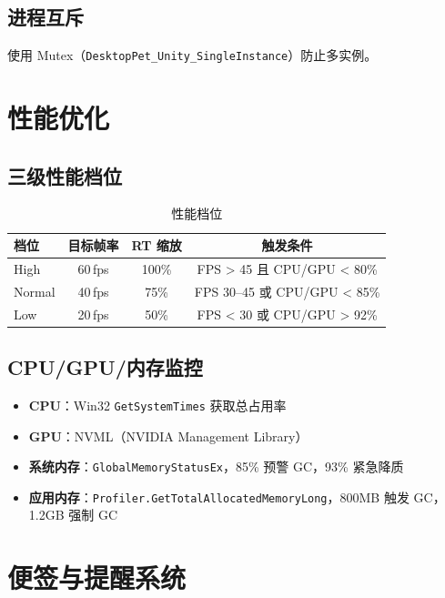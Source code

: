 \documentclass[12pt,a4paper]{ctexart}
\begin{document}
\subsection{进程互斥}

使用 Mutex（\texttt{DesktopPet\_Unity\_SingleInstance}）防止多实例。

\section{性能优化}

\subsection{三级性能档位}

\begin{table}[H]
\centering
\caption{性能档位}
\label{tab:perf}
\begin{tabular}{lccc}
\toprule
\textbf{档位} & \textbf{目标帧率} & \textbf{RT 缩放} & \textbf{触发条件} \\
\midrule
High & 60\,fps & 100\% & FPS > 45 且 CPU/GPU < 80\% \\
Normal & 40\,fps & 75\% & FPS 30--45 或 CPU/GPU < 85\% \\
Low & 20\,fps & 50\% & FPS < 30 或 CPU/GPU > 92\% \\
\bottomrule
\end{tabular}
\end{table}

\subsection{CPU/GPU/内存监控}

\begin{itemize}
    \item \textbf{CPU}：Win32 \texttt{GetSystemTimes} 获取总占用率
    \item \textbf{GPU}：NVML（NVIDIA Management Library）
    \item \textbf{系统内存}：\texttt{GlobalMemoryStatusEx}，85\% 预警 GC，93\% 紧急降质
    \item \textbf{应用内存}：\texttt{Profiler.GetTotalAllocatedMemoryLong}，800MB 触发 GC，1.2GB 强制 GC
\end{itemize}

\section{便签与提醒系统}
\end{document}
